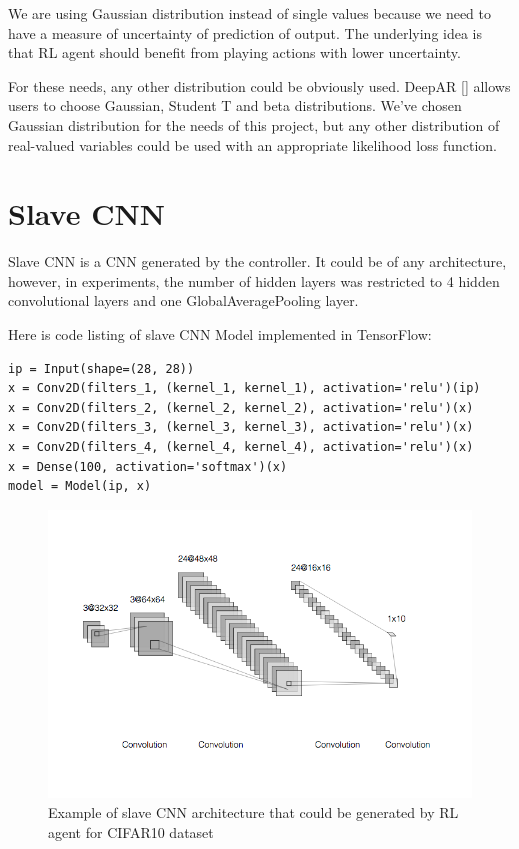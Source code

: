 We are using Gaussian distribution instead of single values because we need to have a measure of uncertainty of prediction of output. The underlying idea is that RL agent should benefit from playing actions with lower uncertainty.

For these needs, any other distribution could be obviously used. DeepAR [\cite{2017arXiv170404110S}] allows users to choose Gaussian, Student T and beta distributions. We've chosen Gaussian distribution for the needs of this project, but any other distribution of real-valued variables could be used with an appropriate likelihood loss function.

\section{Slave CNN}

Slave CNN is a CNN generated by the controller. It could be of any architecture, however, in experiments, the number of hidden layers was restricted to 4 hidden convolutional layers and one GlobalAveragePooling layer.

Here is code listing of slave CNN Model implemented in TensorFlow:

\begin{verbatim}
ip = Input(shape=(28, 28))
x = Conv2D(filters_1, (kernel_1, kernel_1), activation='relu')(ip)
x = Conv2D(filters_2, (kernel_2, kernel_2), activation='relu')(x)
x = Conv2D(filters_3, (kernel_3, kernel_3), activation='relu')(x)
x = Conv2D(filters_4, (kernel_4, kernel_4), activation='relu')(x)
x = Dense(100, activation='softmax')(x)
model = Model(ip, x)
\end{verbatim}

\begin{figure}[!htb]
  \includegraphics[width=\linewidth]{images/slave-example.png}
  \caption{Example of slave CNN architecture that could be generated by RL agent for CIFAR10 dataset}
  \label{fig:slave}
\end{figure}


